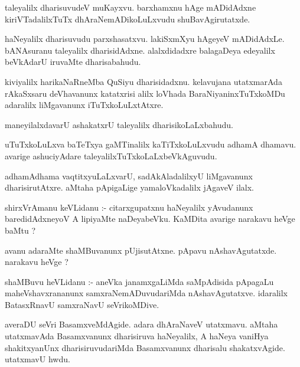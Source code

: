 \documentclass{article}
\begin{document}
\begin{mn}
taleyalilx  dharisuvudeV  muKayxvu.  barxhamxnu  hAge  mADidAdxne  kiriVTadalilxTuTx  dhAraNemADikoLuLxvudu  
shuBavAgirutatxde.
\end{mn}

\begin{mn}
haNeyalilx  dharisuvudu  parxshasatxvu.  lakiSxmXyu  hAgeyeV  mADidAdxLe.  bANAsuranu  taleyalilx  dharisidAdxne.  
alalxdidadxre  balagaDeya  edeyalilx  beVkAdarU  iruvaMte  dharisabahudu.
\end{mn}

\begin{mn}
kiviyalilx  harikaNaRneMba  QuSiyu  dharisidadxnu.  kelavujana  utatxmarAda  rAkaSxsaru  deVhavanunx  katatxrisi  
alilx  loVhada  BaraNiyaninxTuTxkoMDu  adaralilx  liMgavanunx  iTuTxkoLuLxtAtxre.
\end{mn}

\begin{mn}
maneyilalxdavarU  ashakatxrU  taleyalilx  dharisikoLaLxbahudu.
\end{mn}

\begin{mn}
uTuTxkoLuLxva  baTeTxya  gaMTinalilx  kaTiTxkoLuLxvudu  adhamA dhamavu.  avarige  ashuciyAdare  
taleyalilxTuTxkoLaLxbeVkAguvudu.
\end{mn}

\begin{mn}
adhamAdhama  vaqtitxyuLaLxvarU,  sadAkAladalilxyU  liMgavanunx  dharisirutAtxre.  aMtaha  pApigaLige  
yamaloVkadalilx  jAgaveV  ilalx.
\end{mn}

\begin{mn}
shirxVrAmanu  keVLidanu :- citarxgupatxnu  haNeyalilx  yAvudanunx  baredidAdxneyoV  A  lipiyaMte  
naDeyabeVku.  KaMDita  avarige  narakavu  heVge  baMtu ?
\end{mn}

\begin{mn}
avanu  adaraMte  shaMBuvanunx  pUjisutAtxne.  pApavu  nAshavAgutatxde.  narakavu  heVge ?
\end{mn}

\begin{mn}
shaMBuvu  heVLidanu :- aneVka  janamxgaLiMda  saMpAdisida  pApagaLu  maheVshavxrananunx  
samxraNemADuvudariMda  nAshavAgutatxve.  idaralilx  BatasxRnavU  samxraNavU  seVrikoMDive. 
\end{mn}

\begin{mn}
averaDU  seVri  BasamxveMdAgide.  adara  dhAraNaveV  utatxmavu.  aMtaha  utatxmavAda  Basamxvanunx  
dharisiruva  haNeyalilx,  A  haNeya  vaniHya  shakitxyanUnx  dharisiruvudariMda  Basamxvanunx  dharisalu  
shakatxvAgide.  utatxmavU  hwdu.
\end{mn}
\end{document}
